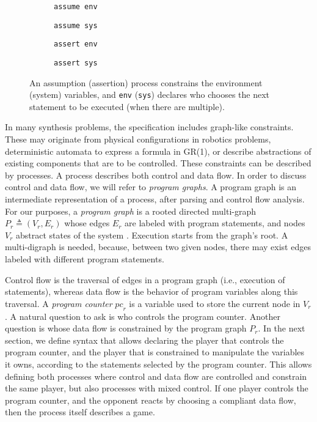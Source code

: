 \documentclass[copyright]{eptcs}
\begin{document}
\begin{figure}
	\begin{subfigure}{0.24\textwidth}
		\centering
		
		\caption{\texttt{assume env}}
	\end{subfigure}
	\begin{subfigure}{0.24\textwidth}
		\centering
		
		\caption{\texttt{assume sys}}
	\end{subfigure}
	\begin{subfigure}{0.24\textwidth}
		\centering
		
		\caption{\texttt{assert env}}
	\end{subfigure}
	\begin{subfigure}{0.24\textwidth}
		\centering
		
		\caption{\texttt{assert sys}}
	\end{subfigure}
	\caption{An assumption (assertion) process constrains the environment (system) variables, and \texttt{env} (\texttt{sys}) declares who chooses the next statement to be executed (when there are multiple).}
	\label{fig:flow-quantification}
\end{figure}

In many synthesis problems, the specification includes graph-like constraints.
These may originate from physical configurations in robotics problems, deterministic automata to express a formula in GR(1), or describe abstractions of existing components that are to be controlled.
These constraints can be described by processes.
A process describes both control and data flow.
In order to discuss control and data flow, we will refer to {\em program graphs}.
A program graph is an intermediate representation of a process, after parsing and control flow analysis.
For our purposes, a {\em program graph} is a rooted directed multi-graph $P_r \triangleq (V_r, E_r)$ whose edges $E_r$ are labeled with program statements, and nodes $V_r$ abstract states of the system \cite{Keller76cacm,Baier08}.
Execution starts from the graph's root.
A multi-digraph is needed, because, between two given nodes, there may exist edges labeled with different program statements.

Control flow is the traversal of edges in a program graph (i.e., execution of statements), whereas data flow is the behavior of program variables along this traversal.
A {\em program counter} $\mathit{pc}_r$ is a variable used to store the current node in $V_r$.
A natural question to ask is who controls the program counter.
Another question is whose data flow is constrained by the program graph $P_r$.
In the next section, we define syntax that allows declaring the player that controls the program counter, and the player that is constrained to manipulate the variables it owns, according to the statements selected by the program counter.
This allows defining both processes where control and data flow are controlled and constrain the same player, but also processes with mixed control.
If one player controls the program counter, and the opponent reacts by choosing a compliant data flow, then the process itself describes a game.
\end{document}
